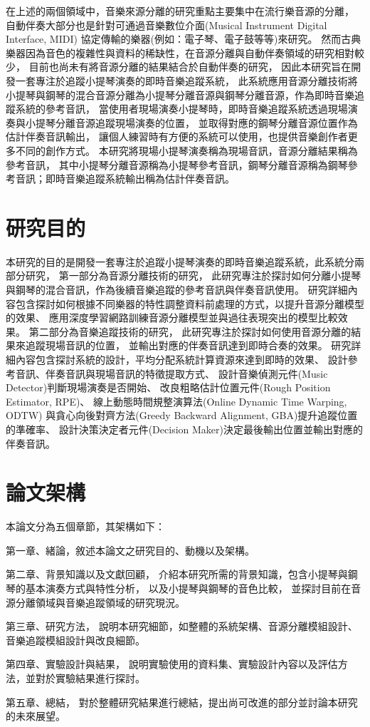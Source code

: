 \documentclass[class=NCU_thesis, crop=false]{standalone}
\begin{document}
在上述的兩個領域中，音樂來源分離的研究重點主要集中在流行樂音源的分離，
自動伴奏大部分也是針對可通過音樂數位介面(Musical Instrument Digital Interface, MIDI)
協定傳輸的樂器(例如：電子琴、電子鼓等等)來研究。
然而古典樂器因為音色的複雜性與資料的稀缺性，在音源分離與自動伴奏領域的研究相對較少，
目前也尚未有將音源分離的結果結合於自動伴奏的研究，
因此本研究旨在開發一套專注於追蹤小提琴演奏的即時音樂追蹤系統，
此系統應用音源分離技術將小提琴與鋼琴的混合音源分離為小提琴分離音源與鋼琴分離音源，作為即時音樂追蹤系統的參考音訊，
當使用者現場演奏小提琴時，即時音樂追蹤系統透過現場演奏與小提琴分離音源追蹤現場演奏的位置，
並取得對應的鋼琴分離音源位置作為估計伴奏音訊輸出，
讓個人練習時有方便的系統可以使用，也提供音樂創作者更多不同的創作方式。
本研究將現場小提琴演奏稱為現場音訊，音源分離結果稱為參考音訊，
其中小提琴分離音源稱為小提琴參考音訊，鋼琴分離音源稱為鋼琴參考音訊；即時音樂追蹤系統輸出稱為估計伴奏音訊。

\pagebreak

\section{研究目的}

本研究的目的是開發一套專注於追蹤小提琴演奏的即時音樂追蹤系統，此系統分兩部分研究，
第一部分為音源分離技術的研究，
此研究專注於探討如何分離小提琴與鋼琴的混合音訊，作為後續音樂追蹤的參考音訊與伴奏音訊使用。
研究詳細內容包含探討如何根據不同樂器的特性調整資料前處理的方式，以提升音源分離模型的效果、
應用深度學習網路訓練音源分離模型並與過往表現突出的模型比較效果。
第二部分為音樂追蹤技術的研究，
此研究專注於探討如何使用音源分離的結果來追蹤現場音訊的位置，
並輸出對應的伴奏音訊達到即時合奏的效果。
研究詳細內容包含探討系統的設計，平均分配系統計算資源來達到即時的效果、
設計參考音訊、伴奏音訊與現場音訊的特徵提取方式、
設計音樂偵測元件(Music Detector)判斷現場演奏是否開始、
改良粗略估計位置元件(Rough Position Estimator, RPE)、
線上動態時間規整演算法(Online Dynamic Time Warping, ODTW)
與貪心向後對齊方法(Greedy Backward Alignment, GBA)提升追蹤位置的準確率、
設計決策決定者元件(Decision Maker)決定最後輸出位置並輸出對應的伴奏音訊。

\pagebreak

\section{論文架構}
本論文分為五個章節，其架構如下：

第一章、緒論，敘述本論文之研究目的、動機以及架構。

第二章、背景知識以及文獻回顧，
介紹本研究所需的背景知識，包含小提琴與鋼琴的基本演奏方式與特性分析，
以及小提琴與鋼琴的音色比較，
並探討目前在音源分離領域與音樂追蹤領域的研究現況。

第三章、研究方法，
說明本研究細節，如整體的系統架構、音源分離模組設計、音樂追蹤模組設計與改良細節。

第四章、實驗設計與結果，
說明實驗使用的資料集、實驗設計內容以及評估方法，並對於實驗結果進行探討。

第五章、總結，
對於整體研究結果進行總結，提出尚可改進的部分並討論本研究的未來展望。

\pagebreak
\end{document}
